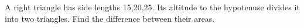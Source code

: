 A right triangle has side lengths 15,20,25. Its altitude to the hypotenuse divides it into two triangles. Find the difference between their areas.
